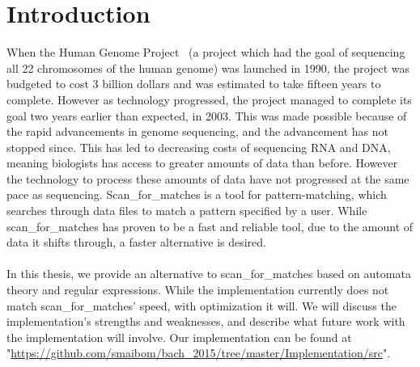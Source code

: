 \section{Introduction}%
When the Human Genome Project~\cite{hgp} (a project which had the goal of sequencing 
all 22 chromosomes of the human genome) was launched in 1990, the project was 
budgeted to cost 3 billion dollars and was estimated to take fifteen years 
to complete. However as technology progressed, the project managed to complete 
its goal two years earlier than expected, in 2003. This was made possible 
because of the rapid advancements in genome sequencing, and the advancement 
has not stopped since. This has led to decreasing costs of sequencing RNA and DNA, 
meaning biologists has access to greater amounts of data than before. 
However the technology to process these amounts of data have not progressed at 
the same pace as sequencing. Scan\_for\_matches is a tool for pattern-matching, 
which searches through data files to match a pattern specified by a user. 
While scan\_for\_matches has proven to be a fast and reliable 
tool, due to the amount of data it shifts through, a faster alternative 
is desired.\\\\
In this thesis, we provide an alternative to scan\_for\_matches based on 
automata theory and regular expressions. While the implementation currently 
does not match scan\_for\_matches' speed, with optimization it will. We will 
discuss the implementation's strengths and weaknesses, and describe what 
future work with the implementation will involve.
Our implementation can be found at 
"\url{https://github.com/smaibom/bach_2015/tree/master/Implementation/src}".
\begin{comment}
After hearing about this problem, we thought that there must be a better 
way of searching through data that is also theoretically sound. Our first 
thought was using automata-based searching methods, since this provides a 
calculable best- and worst-case run time while being theoretically sound. 
Since regular expressions uses an automata-based way of searching, we hypothesized 
that implementing regular expressions which have the same functions as 
scan\_for\_matches would lead to faster run times.
\end{comment}
